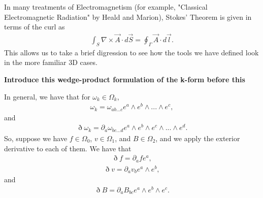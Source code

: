 \documentclass{book}
\begin{document}
In many treatments of Electromagnetism (for example, "Classical Electromagnetic Radiation" by Heald and Marion), Stokes' Theorem is given in terms of the curl as \begin{gather}\int_S \nabla \times \vec{A} \cdot d\vec{S} = \oint_{\Gamma} \vec{A} \cdot d\vec{l}.\end{gather} This allows us to take a brief digression to see how the tools we have defined look in the more familiar 3D cases. 

\textbf{Introduce this wedge-product formulation of the k-form before this}

In general, we have that for $\omega_k \in \Omega_k$, \begin{gather}\omega_k = \omega_{ab...c}e^a\wedge e^b \wedge ... \wedge e^c,\end{gather} and \begin{gather} \eth \omega_k = \partial_a\omega_{bc...d}e^a\wedge e^b\wedge e^c\wedge ... \wedge e^d.\end{gather} So, suppose we have $f \in \Omega_0$, $v \in \Omega_1$, and $B \in \Omega_2$, and we apply the exterior derivative to each of them. We have that \begin{gather}\eth f = \partial_a f e^a,\end{gather} \begin{gather}\eth v = \partial_a v_b e^a \wedge e^b,\end{gather} and \begin{gather}\eth B = \partial_a B_{bc} e^a\wedge e^b \wedge e^c.\end{gather} 
\end{document}
